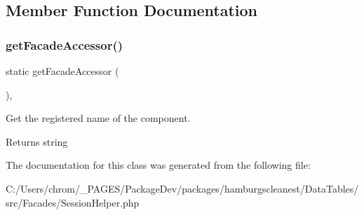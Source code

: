 \subsection{Member Function Documentation}
\mbox{\label{classhamburgscleanest_1_1_data_tables_1_1_facades_1_1_session_helper_a19a808201f41f32f71a0532cb49b450f}} 
\subsubsection{\texorpdfstring{get\+Facade\+Accessor()}{getFacadeAccessor()}}
{\footnotesize\ttfamily static get\+Facade\+Accessor (\begin{DoxyParamCaption}{ }\end{DoxyParamCaption})\hspace{0.3cm}{\ttfamily [static]}, {\ttfamily [protected]}}

Get the registered name of the component.

\begin{DoxyReturn}{Returns}
string 
\end{DoxyReturn}


The documentation for this class was generated from the following file\+:\begin{DoxyCompactItemize}
\item 
C\+:/\+Users/chrom/\+\_\+\+P\+A\+G\+E\+S/\+Package\+Dev/packages/hamburgscleanest/\+Data\+Tables/src/\+Facades/Session\+Helper.\+php\end{DoxyCompactItemize}
